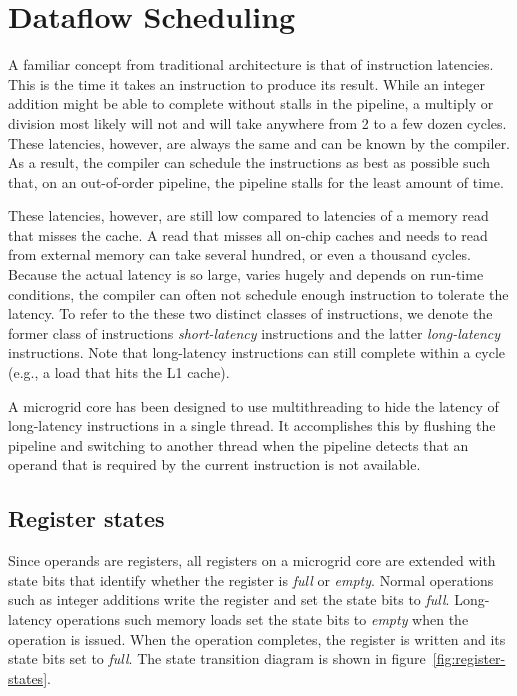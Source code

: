 \chapter{\label{chapter:dataflow}Dataflow Scheduling}

A familiar concept from traditional architecture is that of instruction latencies. This is the time it takes an instruction to produce its result. While an integer addition might be able to complete without stalls in the pipeline, a multiply or division most likely will not and will take anywhere from 2 to a few dozen cycles. These latencies, however, are always the same and can be known by the compiler. As a result, the compiler can schedule the instructions as best as possible such that, on an out-of-order pipeline, the pipeline stalls for the least amount of time.

These latencies, however, are still low compared to latencies of a memory read that misses the cache. A read that misses all on-chip caches and needs to read from external memory can take several hundred, or even a thousand cycles. Because the actual latency is so large, varies hugely and depends on run-time conditions, the compiler can often not schedule enough instruction to tolerate the latency. To refer to the these two distinct classes of instructions, we denote the former class of instructions \emph{short-latency} instructions and the latter \emph{long-latency} instructions. Note that long-latency instructions can still complete within a cycle (e.g., a load that hits the L1 cache).

A microgrid core has been designed to use multithreading to hide the latency of long-latency instructions in a single thread. It accomplishes this by flushing the pipeline and switching to another
thread when the pipeline detects that an operand that is required by the current instruction is not available.

\section{Register states}
Since operands are registers, all registers on a microgrid core are extended with state bits that identify whether the register is \emph{full} or \emph{empty}. Normal operations such as integer additions write the register and set the state bits to \emph{full}. Long-latency operations such memory loads set the state bits to \emph{empty} when the operation is issued. When the operation completes, the register is written and its state bits set to \emph{full}. The state transition diagram is shown in figure~\ref{fig:register-states}.

